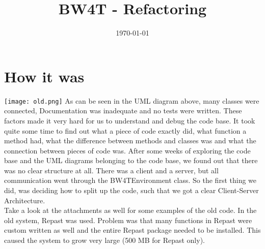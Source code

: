 \documentclass[11pt,a4paper]{article}
\title{BW4T - Refactoring}
\date{\today}
\begin{document}
\maketitle

\section{How it was}
\texttt{[image: old.png]}
As can be seen in the UML diagram above, many classes were connected, Documentation was inadequate and no tests were written. These factors made it very hard for us to understand and debug the code base.
It took quite some time to find out what a piece of code exactly did, what function a method had, what the difference between methods and classes was and what the connection between pieces of code was.
After some weeks of exploring the code base and the UML diagrams belonging to the code base, we found out that there was no clear structure at all. There was a client and a server, but all communication went through the BW4TEnvironment class. So the first thing we did, was deciding how to split up the code, such that we got a clear Client-Server Architecture. \\
\indent Take a look at the attachments as well for some examples of the old code.
In the old system, Repast was used. Problem was that many functions in Repast were custom written as well and the entire Repast package needed to be installed. This caused the system to grow very large (500 MB for Repast only).
\end{document}
